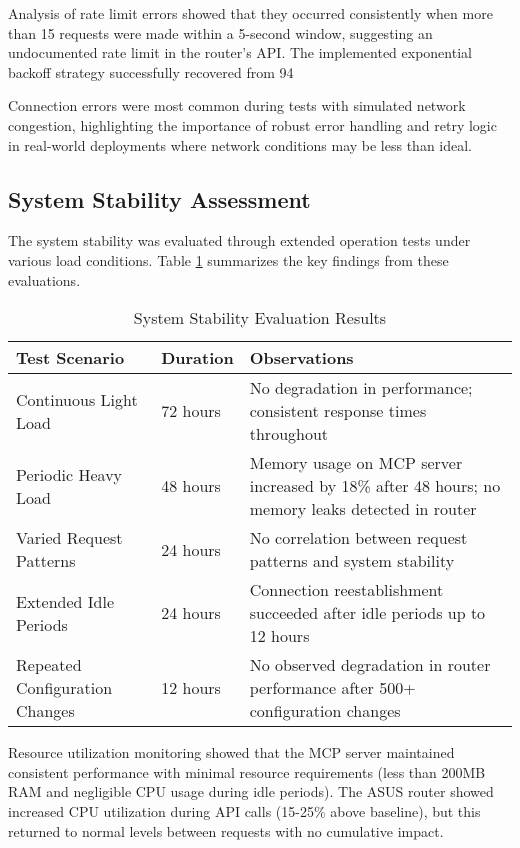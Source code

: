 Analysis of rate limit errors showed that they occurred consistently when more than 15 requests were made within a 5-second window, suggesting an undocumented rate limit in the router's API. The implemented exponential backoff strategy successfully recovered from 94%

Connection errors were most common during tests with simulated network congestion, highlighting the importance of robust error handling and retry logic in real-world deployments where network conditions may be less than ideal.

\subsection{System Stability Assessment}
The system stability was evaluated through extended operation tests under various load conditions. Table \ref{tab:stability-results} summarizes the key findings from these evaluations.

\begin{table}[htbp]
\caption{System Stability Evaluation Results}
\label{tab:stability-results}
\begin{tabular}{|p{3.5cm}|p{4cm}|p{7cm}|}
\hline
\textbf{Test Scenario} & \textbf{Duration} & \textbf{Observations} \\ \hline
Continuous Light Load & 72 hours & No degradation in performance; consistent response times throughout \\ \hline
Periodic Heavy Load & 48 hours & Memory usage on MCP server increased by 18\% after 48 hours; no memory leaks detected in router \\ \hline
Varied Request Patterns & 24 hours & No correlation between request patterns and system stability \\ \hline
Extended Idle Periods & 24 hours & Connection reestablishment succeeded after idle periods up to 12 hours \\ \hline
Repeated Configuration Changes & 12 hours & No observed degradation in router performance after 500+ configuration changes \\ \hline
\end{tabular}
\end{table}

Resource utilization monitoring showed that the MCP server maintained consistent performance with minimal resource requirements (less than 200MB RAM and negligible CPU usage during idle periods). The ASUS router showed increased CPU utilization during API calls (15-25\% above baseline), but this returned to normal levels between requests with no cumulative impact.

